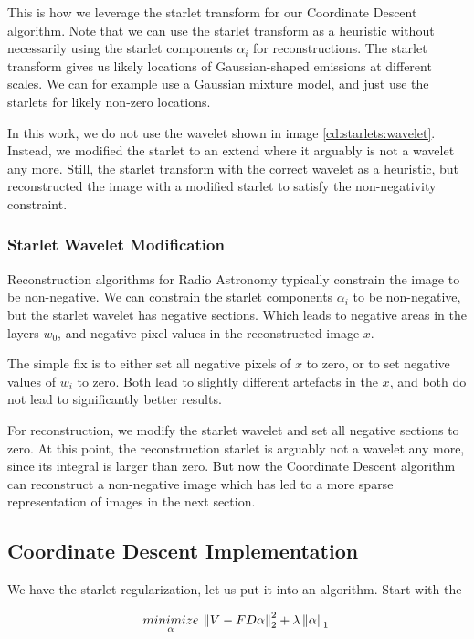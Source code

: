 This is how we  leverage the starlet transform for our Coordinate Descent algorithm. Note that we can use the starlet transform as a heuristic without necessarily using the starlet components $\alpha_i$ for reconstructions. The starlet transform gives us likely locations of Gaussian-shaped emissions at different scales. We can for example use a Gaussian mixture model, and just use the starlets for likely non-zero locations. 

In this work, we do not use the wavelet shown in image \ref{cd:starlets:wavelet}. Instead, we modified the starlet to an extend where it arguably is not a wavelet any more. Still, the starlet transform with the correct wavelet as a heuristic, but reconstructed the image with a modified starlet to satisfy the non-negativity constraint. 


\subsubsection{Starlet Wavelet Modification}
Reconstruction algorithms for Radio Astronomy typically constrain the image to be non-negative\cite{mcewen2011compressed}. We can constrain the starlet components $\alpha_i$ to be non-negative, but the starlet wavelet has negative sections. Which leads to negative areas in the layers $w_0$, and negative pixel values in the reconstructed image $x$.

The simple fix is to either set all negative pixels of $x$ to zero, or to set negative values of $w_i$ to zero. Both lead to slightly different artefacts in the $x$, and both do not lead to significantly better results.

For reconstruction, we modify the starlet wavelet and set all negative sections to zero. At this point, the reconstruction starlet is arguably not a wavelet any more, since its integral is larger than zero. But now the Coordinate Descent algorithm can reconstruct a non-negative image which has led to a more sparse representation of images in the next section.


\subsection{Coordinate Descent Implementation}
We have the starlet regularization, let us put it into an algorithm. Start with the 

\begin{equation}\label{cd:starlet}
\underset{\alpha}{minimize} \: \left \| V - FD\alpha \right \|_2^2 + \lambda \left \| \alpha \right \|_1 \\
\end{equation}

